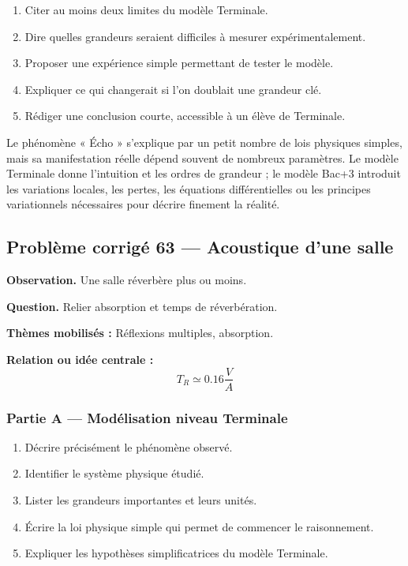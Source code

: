 \documentclass[11pt,a4paper]{article}
\begin{document}
\begin{enumerate}
  \item Citer au moins deux limites du modèle Terminale.
  \item Dire quelles grandeurs seraient difficiles à mesurer expérimentalement.
  \item Proposer une expérience simple permettant de tester le modèle.
  \item Expliquer ce qui changerait si l'on doublait une grandeur clé.
  \item Rédiger une conclusion courte, accessible à un élève de Terminale.
\end{enumerate}

\begin{corrigebox}
Le phénomène « Écho » s'explique par un petit nombre de lois physiques simples, mais sa manifestation réelle dépend souvent de nombreux paramètres. Le modèle Terminale donne l'intuition et les ordres de grandeur ; le modèle Bac+3 introduit les variations locales, les pertes, les équations différentielles ou les principes variationnels nécessaires pour décrire finement la réalité.
\end{corrigebox}

\subsection{Problème corrigé 63 — Acoustique d'une salle}

\begin{exercicebox}
\textbf{Observation.} Une salle réverbère plus ou moins.

\medskip
\textbf{Question.} Relier absorption et temps de réverbération.

\medskip
\textbf{Thèmes mobilisés :} Réflexions multiples, absorption.

\medskip
\textbf{Relation ou idée centrale :}
\[
T_R\simeq0.16\frac{V}{A}
\]
\end{exercicebox}

\subsubsection*{Partie A — Modélisation niveau Terminale}

\begin{enumerate}
  \item Décrire précisément le phénomène observé.
  \item Identifier le système physique étudié.
  \item Lister les grandeurs importantes et leurs unités.
  \item Écrire la loi physique simple qui permet de commencer le raisonnement.
  \item Expliquer les hypothèses simplificatrices du modèle Terminale.
\end{enumerate}
\end{document}

